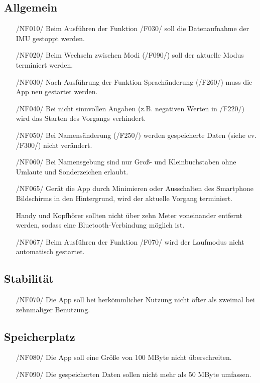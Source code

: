 \documentclass[a4paper,12pt]{article}
\begin{document}
\subsection{Allgemein}
\begin{itemize}
  \item[/NF010/] Beim Ausführen der Funktion /F030/ soll die Datenaufnahme der \Gls{IMU} gestoppt werden.
  \item[/NF020/] Beim Wechseln zwischen Modi (/F090/) soll der aktuelle Modus terminiert werden.
  \item[/NF030/] Nach Ausführung der Funktion  Sprachänderung (/F260/) muss die App neu gestartet werden.
  \item[/NF040/] Bei nicht sinnvollen Angaben (z.B. negativen Werten in /F220/) wird das Starten des Vorgangs verhindert.
  \item[/NF050/] Bei Namensänderung (/F250/) werden gespeicherte Daten (siehe ev. /F300/) nicht verändert.
  \item[/NF060/] Bei Namensgebung sind nur Groß- und Kleinbuchstaben ohne Umlaute und Sonderzeichen erlaubt.
  \item[/NF065/] Gerät die App durch Minimieren oder Ausschalten des Smartphone Bildschirms in den Hintergrund, wird der aktuelle Vorgang terminiert.
  \item[] Handy und Kopfhörer sollten nicht über zehn Meter voneinander entfernt werden, sodass eine Bluetooth-Verbindung möglich ist. 
  \item[/NF067/] Beim Ausführen der Funktion /F070/ wird der Laufmodus nicht automatisch gestartet.
\end{itemize}
\subsection{Stabilität}
\begin{itemize}
  \item[/NF070/] Die App soll bei herkömmlicher Nutzung nicht öfter als zweimal bei zehnmaliger Benutzung. %
\end{itemize}
\subsection{Speicherplatz}
\begin{itemize}
  \item[/NF080/] Die App soll eine Größe von 100 MByte nicht überschreiten. %
  \item[/NF090/] Die gespeicherten Daten sollen nicht mehr als 50 MByte umfassen. %
\end{itemize}
\end{document}
